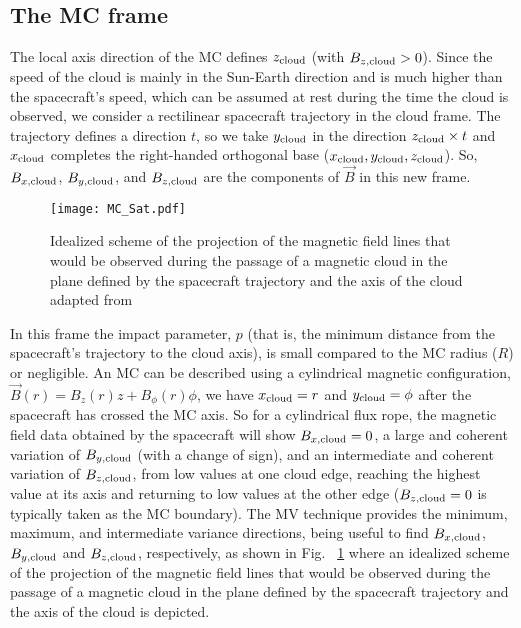 \documentclass[baaa]{baaa}
\begin{document}
\subsection{The MC frame}
The local axis direction of the MC defines ${z}_{\rm cloud}$ (with $B_{z,\rm cloud}>0$).
Since the speed of the cloud is mainly in the Sun-Earth direction and is much higher than the spacecraft's speed, which can be assumed at rest during the time the cloud is observed, we consider a rectilinear spacecraft trajectory in the cloud frame.  The trajectory defines a  direction ${t}$, so we take ${y}_{\rm cloud}$ in the  direction ${z}_{\rm cloud} \times {t}$ and ${x}_{\rm cloud}$ completes the right-handed orthogonal base (${x}_{\rm cloud},{y}_{\rm cloud},{z}_{\rm cloud}$). So,  {$B_{x, \rm cloud}$, $B_{y, \rm cloud}$, and $B_{z,\rm cloud}$} are the  components of $\vec{B}$ in this new frame.
\begin{figure}[!t]
\centering
\texttt{[image: MC\_Sat.pdf]}
\caption{Idealized scheme of the projection of the magnetic field lines that would be observed during the passage of a magnetic cloud in the plane defined by the spacecraft
trajectory and the axis of the cloud adapted from\citep{Bothmer1998} }
\label{Fig6}
\end{figure}
In this frame the impact parameter, $p$ (that is, the minimum distance from the spacecraft's trajectory to the cloud axis), is small compared to the MC radius ($R$) or negligible. An MC can be described using a cylindrical magnetic configuration, $\vec{B}(r) = B_z(r) {z} + B_\phi(r) {\phi}$, we have ${x}_{\rm cloud} = {r}$ and ${y}_{\rm cloud} = {\phi}$ after the spacecraft has crossed the MC axis. So for a cylindrical flux rope, the magnetic field data obtained by the spacecraft will show $B_{x, \rm cloud}=0$, a large and coherent variation of $B_{y, \rm cloud}$ (with a change of sign), and an intermediate and coherent variation of $B_{z, \rm cloud}$, from low values at one cloud edge, reaching the highest value at its axis and returning to low values at the other edge ($B_{z, \rm cloud}=0$ is typically taken as the MC boundary). The MV technique provides the minimum, maximum, and intermediate variance directions, being useful to find $B_{x, \rm cloud}$, $B_{y, \rm cloud}$ and $B_{z, \rm cloud}$, respectively, as shown in Fig. ~\ref{Fig6} where an idealized scheme of the projection of the magnetic field lines that would be observed during the passage of a magnetic cloud in the plane defined by the spacecraft trajectory and the axis of the cloud is depicted.
\end{document}

